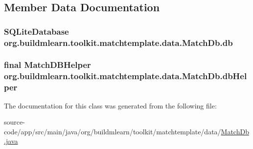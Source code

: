 \subsection{Member Data Documentation}
\subsubsection[{\texorpdfstring{db}{db}}]{\setlength{\rightskip}{0pt plus 5cm}S\+Q\+Lite\+Database org.\+buildmlearn.\+toolkit.\+matchtemplate.\+data.\+Match\+Db.\+db\hspace{0.3cm}{\ttfamily [private]}}\hypertarget{classorg_1_1buildmlearn_1_1toolkit_1_1matchtemplate_1_1data_1_1MatchDb_a165218ecad83ee3dda6bb82c993b5c84}{}\label{classorg_1_1buildmlearn_1_1toolkit_1_1matchtemplate_1_1data_1_1MatchDb_a165218ecad83ee3dda6bb82c993b5c84}
\subsubsection[{\texorpdfstring{db\+Helper}{dbHelper}}]{\setlength{\rightskip}{0pt plus 5cm}final Match\+D\+B\+Helper org.\+buildmlearn.\+toolkit.\+matchtemplate.\+data.\+Match\+Db.\+db\+Helper\hspace{0.3cm}{\ttfamily [private]}}\hypertarget{classorg_1_1buildmlearn_1_1toolkit_1_1matchtemplate_1_1data_1_1MatchDb_af7159826cc3cc046e7371e971300fa2b}{}\label{classorg_1_1buildmlearn_1_1toolkit_1_1matchtemplate_1_1data_1_1MatchDb_af7159826cc3cc046e7371e971300fa2b}


The documentation for this class was generated from the following file\+:\begin{DoxyCompactItemize}
\item 
source-\/code/app/src/main/java/org/buildmlearn/toolkit/matchtemplate/data/\hyperlink{MatchDb_8java}{Match\+Db.\+java}\end{DoxyCompactItemize}
